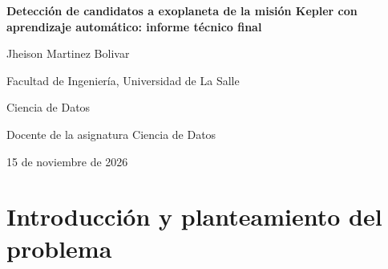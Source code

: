 \documentclass[a4paper,12pt]{article}
\begin{document}
  \begin{center}
    \vspace*{2cm}
    \textbf{Detección de candidatos a exoplaneta de la misión Kepler con
    aprendizaje automático: informe técnico final}
    \vspace{\baselineskip}

    Jheison Martinez Bolivar

    \vspace{\baselineskip}
    Facultad de Ingeniería, Universidad de La Salle

    Ciencia de Datos

    Docente de la asignatura Ciencia de Datos

    15 de noviembre de 2026
  \end{center}
  \newpage

  \begin{abstract}
    La misión Kepler detectó miles de señales de tránsito cuya verificación manual es
    costosa, por lo que clasificar automáticamente los objetos KOI marcados como
    candidatos es una pregunta abierta con salida práctica: producir una lista
    priorizada de candidatos a planeta. Este informe documenta el ciclo completo del
    proyecto: exploración del NASA Exoplanet Archive (9 564 KOI), limpieza con control
    de fuga de datos, tratamiento de valores faltantes no aleatorios, transformaciones
    logarítmicas e ingeniería de variables físicas; partición estratificada fija
    60/20/20 con métrica F1 macro; y comparación justa de un baseline de regresión
    logística contra bosques aleatorios, gradient boosting y SVM de núcleo RBF,
    afinados con RandomizedSearchCV y evaluados en prueba una sola vez. El modelo
    final de gradient boosting alcanzó F1 macro de 0.983 y AUC de 0.997 en prueba,
    frente a 0.946 y 0.991 del baseline, con 98.0 \% de los planetas recuperados y
    solo 24 errores de 1 518 objetos. La importancia por permutación muestra que el
    modelo aprende los mismos indicios físicos que usa el vetting astronómico
    (calidad de la señal y multiplicidad del sistema). Sobre los 1 977 candidatos sin
    verificar, el modelo propone 653 como planeta con probabilidad calibrada de
    decisión, priorizados en un entregable reproducible.
  \end{abstract}
  \newpage

  \section{Introducción y planteamiento del problema}
\end{document}

